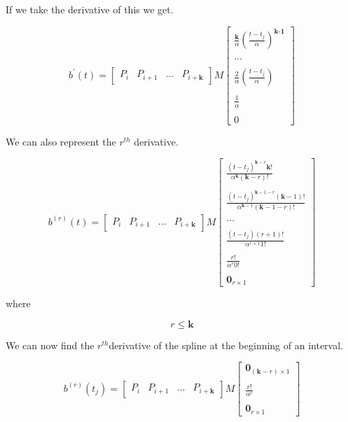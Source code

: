 \documentclass{article}
\begin{document}
If we take the derivative of this we get.

\begin{equation}
    b^{\prime}(t) = \begin{bmatrix} P_{i} & P_{i+1} & ... & P_{i+\textbf{k}}\end{bmatrix} M \begin{bmatrix} \frac{\textbf{k}}{\alpha} (\frac{t-t_j}{\alpha})^\textbf{k-1} \\ \\ ... \\ \\ \frac{2}{\alpha}(\frac{t-t_j}{\alpha}) \\ \\ \frac{1}{\alpha} \\ \\ 0 \end{bmatrix}
\end{equation}

We can also represent the \(r^{th}\) derivative.

\begin{equation}
    b^{(r)}(t) = \begin{bmatrix} P_{i} & P_{i+1} & ... & P_{i+\textbf{k}}\end{bmatrix} M \begin{bmatrix}
    \frac{(t-t_j)^{\textbf{k}-r} \textbf{k}!}{ \alpha^{\textbf{k}} (\textbf{k}-r)!} \\ \\ \frac{(t-t_j)^{\textbf{k}-1-r} (\textbf{k}-1)!}{ \alpha^{\textbf{k}-1} (\textbf{k}-1-r)!} \\ \\ 
    ... 
    \\ \\ 
    \frac{(t-t_j)(r+1)!}{\alpha^{r+1} 1! } 
    \\ \\ \frac{r!}{\alpha^r 0!} 
    \\ \\ \textbf{0}_{r \times 1} \end{bmatrix}
\end{equation}

where

\begin{equation}
    r \leq \textbf{k}
\end{equation}

We can now find the \(r^{th}\)derivative of the spline at the beginning of an interval.

\begin{equation}
    b^{(r)}(t_{j}) = \begin{bmatrix} P_{i} & P_{i+1} & ... & P_{i+\textbf{k}}\end{bmatrix} M \begin{bmatrix} \textbf{0}_{(\textbf{k}-r) \times 1} \\ \\ \frac{r!}{\alpha^r} \\ \\ \textbf{0}_{r \times 1} \end{bmatrix}
\end{equation}
\end{document}

